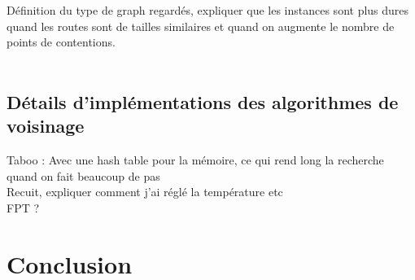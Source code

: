 \documentclass[english]{article}
\begin{document}
Définition du type de graph regardés, expliquer que les instances sont plus dures quand les routes sont de tailles similaires et quand on augmente le nombre de points de contentions.\\
\
\subsection{Détails d'implémentations des algorithmes de voisinage}
Taboo : Avec une hash table pour la mémoire, ce qui rend long la recherche quand on fait beaucoup de pas\\
Recuit, expliquer comment j'ai réglé la température etc\\

FPT ?

\section{Conclusion}


\end{document}
